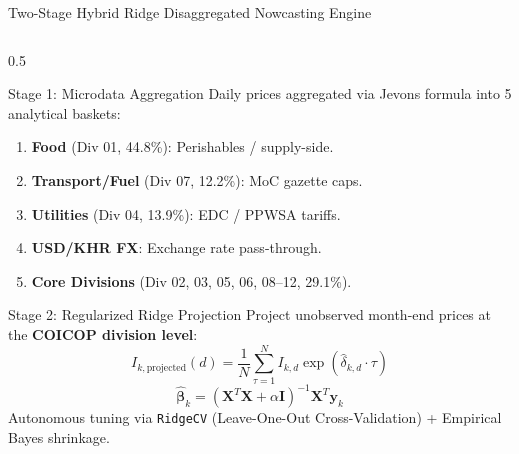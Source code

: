 \documentclass[aspectratio=169, 10pt]{beamer}
\begin{document}
\begin{frame}[shrink=15]{Two-Stage Hybrid Ridge Disaggregated Nowcasting Engine}
  \begin{columns}
    \begin{column}{0.5\textwidth}
      \begin{block}{Stage 1: Microdata Aggregation}
        Daily prices aggregated via Jevons formula into 5 analytical baskets:
        \begin{enumerate}
          \item \textbf{Food} (Div 01, 44.8\%): Perishables / supply-side.
          \item \textbf{Transport/Fuel} (Div 07, 12.2\%): MoC gazette caps.
          \item \textbf{Utilities} (Div 04, 13.9\%): EDC / PPWSA tariffs.
          \item \textbf{USD/KHR FX}: Exchange rate pass-through.
          \item \textbf{Core Divisions} (Div 02, 03, 05, 06, 08--12, 29.1\%).
        \end{enumerate}
      \end{block}

      \begin{exampleblock}{Stage 2: Regularized Ridge Projection}
        Project unobserved month-end prices at the \textbf{COICOP division level}:
        \begin{equation*}
          I_{k, \text{projected}}(d) = \frac{1}{N} \sum_{\tau=1}^N I_{k, d} \exp(\hat{\delta}_{k, d} \cdot \tau)
        \end{equation*}
        \begin{equation*}
          \hat{\boldsymbol{\beta}}_k = (\mathbf{X}^T \mathbf{X} + \alpha \mathbf{I})^{-1} \mathbf{X}^T \mathbf{y}_k
        \end{equation*}
        Autonomous tuning via \texttt{RidgeCV} (Leave-One-Out Cross-Validation) + Empirical Bayes shrinkage.
      \end{exampleblock}
    \end{column}


\end{columns}
\end{frame}
\end{document}
